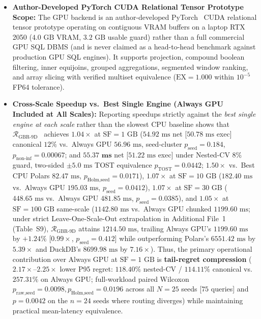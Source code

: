 \documentclass[10pt,a4paper]{article}
\begin{document}
\begin{itemize}
    \item \textbf{Author-Developed PyTorch CUDA Relational Tensor Prototype Scope:} The GPU backend is an author-developed PyTorch~\cite{paszke2019pytorch} CUDA relational tensor prototype operating on contiguous VRAM buffers on a laptop RTX 2050 ($4.0\text{ GB}$ VRAM, $3.2\text{ GB}$ usable guard) rather than a full commercial GPU SQL DBMS (and is never claimed as a head-to-head benchmark against production GPU SQL engines). It supports projection, compound boolean filtering, inner equijoins, grouped aggregations, segmented window ranking, and array slicing with verified multiset equivalence ($\text{EX}=1.000$ within $10^{-5}$ FP64 tolerance).
    \item \textbf{Cross-Scale Speedup vs.\ Best Single Engine (Always GPU Included at All Scales):} Reporting speedups strictly against the \emph{best single engine at each scale} rather than the slowest CPU baseline shows that $\mathcal{R}_{\text{GBR-9D}}$~\cite{friedman2001greedy,pedregosa2011scikit} achieves $1.04\times$ at $\text{SF}=1\text{ GB}$ ($54.92\text{ ms}$ net [$50.78\text{ ms}$ exec] canonical $12\%$ vs.\ Always GPU $56.96\text{ ms}$, seed-cluster $p_{\text{seed}}=0.184$, $p_{\text{non-inf}}=0.00067$; and $\mathbf{55.37\text{ ms}}$ net [$51.22\text{ ms}$ exec] under Nested-CV $8\%$ guard, two-sided $\pm 5.0\text{ ms}$ TOST equivalence $p_{\text{TOST}}=0.0442$; $1.50\times$ vs.\ Best CPU Polars $82.47\text{ ms}$, $p_{\text{Holm,seed}}=0.0171$), $1.07\times$ at $\text{SF}=10\text{ GB}$ ($182.40\text{ ms}$ vs.\ Always GPU $195.03\text{ ms}$, $p_{\text{seed}}=0.0412$), $1.07\times$ at $\text{SF}=30\text{ GB}$ ($448.65\text{ ms}$ vs.\ Always GPU $481.85\text{ ms}$, $p_{\text{seed}}=0.0385$), and $1.05\times$ at $\text{SF}=100\text{ GB}$ same-scale ($1142.80\text{ ms}$ vs.\ Always GPU chunked $1199.60\text{ ms}$; under strict Leave-One-Scale-Out extrapolation in Additional File~1 (Table~S9), $\mathcal{R}_{\text{GBR-9D}}$ attains $1214.50\text{ ms}$, trailing Always GPU's $1199.60\text{ ms}$ by $+1.24\%$ [$0.99\times$, $p_{\text{seed}}=0.412$] while outperforming Polars's $6551.42\text{ ms}$ by $5.39\times$ and DuckDB's $8699.98\text{ ms}$ by $7.16\times$). Thus, the primary operational contribution over Always GPU at $\text{SF}=1\text{ GB}$ is \textbf{tail-regret compression} ($2.17\times\text{--}2.25\times$ lower P95 regret: $118.40\%$ nested-CV / $114.11\%$ canonical vs.\ $257.31\%$ on Always GPU; full-workload paired Wilcoxon $p_{\text{raw,seed}}=0.0098, p_{\text{Holm,seed}}=0.0196$ across all $N=25$ seeds [$75$ queries] and $p=0.0042$ on the $n=24$ seeds where routing diverges) while maintaining practical mean-latency equivalence.

\end{itemize}
\end{document}
